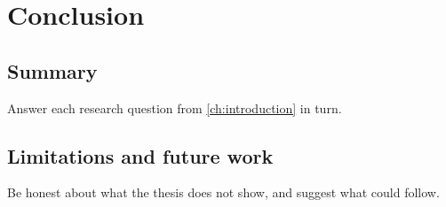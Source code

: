 \chapter{Conclusion}
\label{ch:conclusion}

\section{Summary}
Answer each research question from \cref{ch:introduction} in turn.

\section{Limitations and future work}
Be honest about what the thesis does not show, and suggest what could follow.
